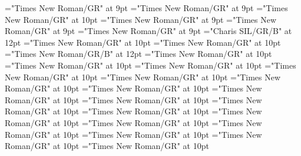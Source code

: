 \documentclass[gps1,twoside]{article}
\begin{document}
\font\spanspanpicturessubentrysubentriesentrybefore="Times New Roman/GR" at 9pt
\font\picturessubentrysubentriesentryafter="Times New Roman/GR" at 9pt
\font\picturepicturessubentrysubentriesentry="Times New Roman/GR" at 10pt
\font\picturepicturessubentrysubentriesentryafter="Times New Roman/GR" at 9pt
\font\spanspancaptionpicturepicturessubentrysubentriesentrybefore="Times New Roman/GR" at 9pt
\font\subentriessubentrysubentriesentryafter="Times New Roman/GR" at 9pt
\font\spanbzhheadwordminorentrycomplex="Charis SIL/GR/B" at 12pt
\font\spanspanheadwordminorentrycomplexbefore="Times New Roman/GR" at 10pt
\font\spanheadwordminorentrycomplexlastchildafter="Times New Roman/GR" at 10pt
\font\spanheadwordminorentrycomplex="Times New Roman/GR/B" at 12pt
\font\pronunciationpronunciationpronunciationsminorentrycomplexbefore="Times New Roman/GR" at 10pt
\font\pronunciationsminorentrycomplexafter="Times New Roman/GR" at 10pt
\font\spanspanformpronunciationpronunciationsminorentrycomplexbefore="Times New Roman/GR" at 10pt
\font\spanformpronunciationpronunciationsminorentrycomplexfirstchildbefore="Times New Roman/GR" at 10pt
\font\spanformpronunciationpronunciationsminorentrycomplexlastchildafter="Times New Roman/GR" at 10pt
\font\spanspanvariantformentrybackrefsminorentrycomplexbefore="Times New Roman/GR" at 10pt
\font\variantformentrybackrefsminorentrycomplexbefore="Times New Roman/GR" at 10pt
\font\variantformentrybackrefsminorentrycomplexafter="Times New Roman/GR" at 10pt
\font\variantentrytypevariantentrytypevariantentrytypesvariantformentrybackrefvariantformentrybackrefsminorentrycomplexbefore="Times New Roman/GR" at 10pt
\font\variantentrytypesvariantformentrybackrefvariantformentrybackrefsminorentrycomplexafter="Times New Roman/GR" at 10pt
\font\spanspanreverseabbrvariantentrytypevariantentrytypesvariantformentrybackrefvariantformentrybackrefsminorentrycomplexbefore="Times New Roman/GR" at 10pt
\font\spanreverseabbrvariantentrytypevariantentrytypesvariantformentrybackrefvariantformentrybackrefsminorentrycomplexlastchildafter="Times New Roman/GR" at 10pt
\font\spanspanheadwordvariantformentrybackrefvariantformentrybackrefsminorentrycomplexbefore="Times New Roman/GR" at 10pt
\font\spanspanowningentrysummarydefinitionvariantformentrybackrefvariantformentrybackrefsminorentrycomplexbefore="Times New Roman/GR" at 10pt
\font\spanowningentrysummarydefinitionvariantformentrybackrefvariantformentrybackrefsminorentrycomplexlastchildafter="Times New Roman/GR" at 10pt
\font\spanspanvisiblevariantentryrefsminorentrycomplexbefore="Times New Roman/GR" at 10pt
\font\visiblevariantentryrefsminorentrycomplexafter="Times New Roman/GR" at 10pt
\end{document}
